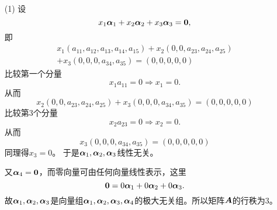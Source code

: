 \begin{frame}[allowframebreaks]
\begin{itemize}
\item[(1)] 设
  $$
  x_1\boldsymbol{\alpha}_1+x_2\boldsymbol{\alpha}_2+x_3\boldsymbol{\alpha}_3=\boldsymbol{0},
  $$
  即
  $$
  \begin{aligned}
  x_1(a_{11},a_{12},a_{13},a_{14},a_{15})+
  x_2(0,0,a_{23},a_{24},a_{25})\\
  +
  x_3(0,0,0,a_{34},a_{35})=(0,0,0,0,0)
  \end{aligned}
  $$  
  比较第一个分量
  $$
  x_1a_{11} = 0 \Rightarrow x_1=0.
  $$  从而
  $$
  x_2(0,0,a_{23},a_{24},a_{25})+
  x_3(0,0,0,a_{34},a_{35})=(0,0,0,0,0)
  $$  
  比较第3个分量
  $$
  x_2a_{23} = 0 \Rightarrow x_2=0.
  $$   从而
  $$
  x_3(0,0,0,a_{34},a_{35})=(0,0,0,0,0)
  $$ 
  同理得$x_3=0$。  于是$\boldsymbol{\alpha}_1,\boldsymbol{\alpha}_2,\boldsymbol{\alpha}_3$线性无关。 
  \vspace{0.1in}

  又$\boldsymbol{\alpha}_4=\boldsymbol{0}$，而零向量可由任何向量线性表示，这里
  $$
  \boldsymbol{0} = 0\boldsymbol{\alpha}_1+0\boldsymbol{\alpha}_2+0\boldsymbol{\alpha}_3.
  $$
  故$\boldsymbol{\alpha}_1,\boldsymbol{\alpha}_2,\boldsymbol{\alpha}_3$是向量组$\boldsymbol{\alpha}_1,\boldsymbol{\alpha}_2,\boldsymbol{\alpha}_3,\boldsymbol{\alpha}_4$的极大无关组。所以矩阵$\boldsymbol{A}$的行秩为3。
\end{itemize}
\end{frame}

